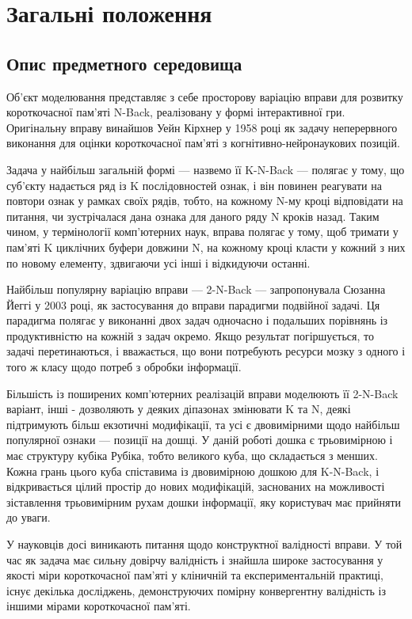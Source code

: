 \section{Загальні положення}
\subsection{Опис предметного середовища}

Об'єкт моделювання представляє з себе просторову варіацію вправи для розвитку короткочасної пам'яті N-Back, реалізовану у формі інтерактивної гри. Оригінальну вправу винайшов Уейн Кірхнер у 1958 році\cite{kirchner} як задачу неперервного виконання для оцінки короткочасної пам'яті з когнітивно-нейронаукових позицій.

Задача у найбільш загальній формі — назвемо її K-N-Back — полягає у тому, що суб'єкту надається ряд із K послідовностей ознак, і він повинен реагувати на повтори ознак у рамках своїх рядів, тобто, на кожному N-му кроці відповідати на питання, чи зустрічалася дана ознака для даного ряду N кроків назад. Таким чином, у термінології комп'ютерних наук, вправа полягає у тому, щоб тримати у пам'яті K циклічних буфери довжини N, на кожному кроці класти у кожний з них по новому елементу, здвигаючи усі інші і відкидуючи останні.

Найбільш популярну варіацію вправи — 2-N-Back — запропонувала Сюзанна Йеггі у 2003 році\cite{jaeggi}, як застосування до вправи парадигми подвійної задачі. Ця парадигма полягає у виконанні двох задач одночасно і подальших порівнянь із продуктивністю на кожній з задач окремо. Якщо результат погіршується, то задачі перетинаються, і вважається, що вони потребують ресурси мозку з одного і того ж класу щодо потреб з обробки інформації.

Більшість із поширених комп'ютерних реалізацій вправи моделюють її 2-N-Back варіант, інші - дозволяють у деяких діпазонах змінювати K та N, деякі підтримують більш екзотичні модифікації, та усі є двовимірними щодо найбільш популярної ознаки — позиції на дошці. У даній роботі дошка є трьовимірною і має структуру кубіка Рубіка, тобто великого куба, що складається з менших. Кожна грань цього куба спіставима із двовимірною дошкою для K-N-Back, і відкривається цілий простір до нових модифікацій, заснованих на можливості зіставлення трьовимірним рухам дошки інформації, яку користувач має прийняти до уваги.

У науковців досі виникають питання щодо конструктної валідності вправи. У той час як задача має сильну довірчу валідність і знайшла широке застосування у якості міри короткочасної пам'яті у кліничній та експериментальній практиці, існує декілька досліджень, демонструючих помірну конвергентну валідність із іншими мірами короткочасної пам'яті\cite{kane-conway}\cite{jaeggi-buschkuehl}.

